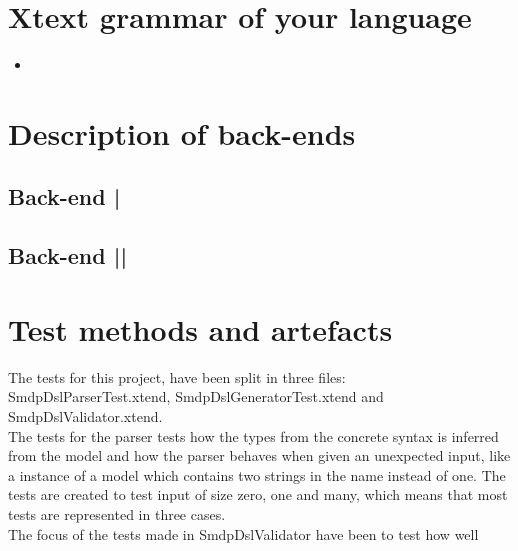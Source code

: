 \documentclass[paper=a4, fontsize=11pt]{scrartcl} %
\numberwithin{equation}{section} %
\numberwithin{figure}{section} %
\numberwithin{table}{section} %
\newcommand{\java}[2]{
\begin{itemize}
\item[]
\end{itemize}
}
\begin{document}
\section{Xtext grammar of your language}
\java{../configproject/xtext/org.xtext.example.smdpdsl/src/org/xtext/example/mydsl/SmdpDsl.xtext}{static}

\section{Description of back-ends}
\subsection{Back-end |}
\subsection{Back-end ||}

\section{Test methods and artefacts}
The tests for this project, have been split in three files: SmdpDslParserTest.xtend, SmdpDslGeneratorTest.xtend and SmdpDslValidator.xtend.\\
The tests for the parser tests how the types from the concrete syntax is inferred from the model and how the parser behaves when given an unexpected input, like a instance of a model which contains two strings in the name instead of one. The tests are created to test input of size zero, one and many, which means that most tests are represented in three cases.\\
The focus of the tests made in SmdpDslValidator have been to test how well  
\end{document}
